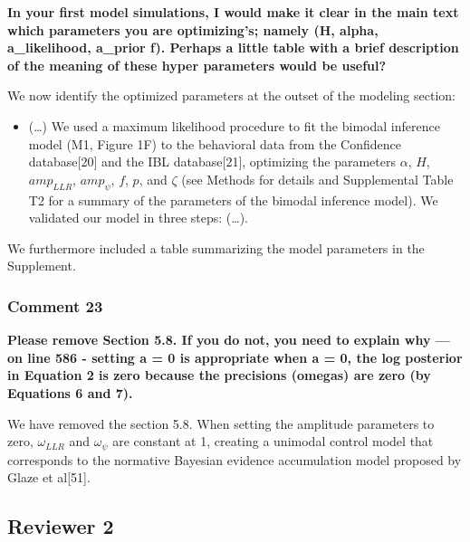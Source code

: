 \documentclass[
]{article}
\providecommand{\tightlist}{%
  \setlength{\itemsep}{0pt}\setlength{\parskip}{0pt}}
\begin{document}
\textbf{In your first model simulations, I would make it clear in the
main text which parameters you are optimizing's; namely (H, alpha,
a\_likelihood, a\_prior f). Perhaps a little table with a brief
description of the meaning of these hyper parameters would be useful?}

We now identify the optimized parameters at the outset of the modeling
section:

\begin{itemize}
\tightlist
\item
  (\ldots) We used a maximum likelihood procedure to fit the bimodal
  inference model (M1, Figure 1F) to the behavioral data from the
  Confidence database{[}20{]} and the IBL database{[}21{]}, optimizing
  the parameters \(\alpha\), \(H\), \(amp_{LLR}\), \(amp_{\psi}\),
  \(f\), \(p\), and \(\zeta\) (see Methods for details and Supplemental
  Table T2 for a summary of the parameters of the bimodal inference
  model). We validated our model in three steps: (\ldots).
\end{itemize}

We furthermore included a table summarizing the model parameters in the
Supplement.

\hypertarget{comment-23}{%
\subsubsection{Comment 23}\label{comment-23}}

\textbf{Please remove Section 5.8. If you do not, you need to explain
why --- on line 586 - setting a = 0 is appropriate when a = 0, the log
posterior in Equation 2 is zero because the precisions (omegas) are zero
(by Equations 6 and 7).}

We have removed the section 5.8. When setting the amplitude parameters
to zero, \(\omega_{LLR}\) and \(\omega_{\psi}\) are constant at 1,
creating a unimodal control model that corresponds to the normative
Bayesian evidence accumulation model proposed by Glaze et al{[}51{]}.

\hypertarget{reviewer-2}{%
\subsection{Reviewer 2}\label{reviewer-2}}
\end{document}
